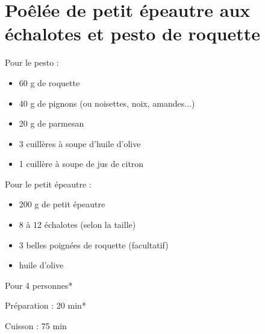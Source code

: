 \section{Poêlée de petit épeautre aux échalotes et pesto de roquette}

\begin{ingredients}
\item Pour le pesto :
\begin{itemize}
\item 60 g de roquette
\item 40 g de pignons (ou noisettes, noix, amandes...)
\item 20 g de parmesan
\item 3 cuillères à soupe d'huile d'olive
\item 1 cuillère à soupe de jus de citron
\end{itemize}
\item Pour le petit épeautre :
\begin{itemize}
\item 200 g de petit épeautre
\item 8 à 12 échalotes (selon la taille)
\item 3 belles poignées de roquette (facultatif)
\item huile d'olive
\end{itemize}
\end{ingredients}
\begin{infos}
\item Pour 4 personnes*		%
\item Préparation : 20 min*		%
\item Cuisson : 75 min		%
\end{infos}
